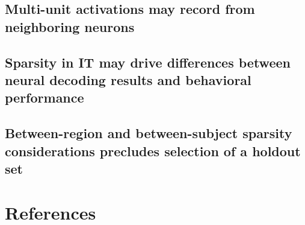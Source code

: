 \documentclass[
  11pt,
  letterpaper,
  DIV=11,
  numbers=noendperiod]{scrartcl}
\begin{document}
\subsection{Multi-unit activations may record from neighboring
neurons}\label{multi-unit-activations-may-record-from-neighboring-neurons}

\subsection{Sparsity in IT may drive differences between neural decoding
results and behavioral
performance}\label{sparsity-in-it-may-drive-differences-between-neural-decoding-results-and-behavioral-performance}

\subsection{Between-region and between-subject sparsity considerations
precludes selection of a holdout
set}\label{between-region-and-between-subject-sparsity-considerations-precludes-selection-of-a-holdout-set}

\pagebreak

\section{References}\label{references}
\end{document}
